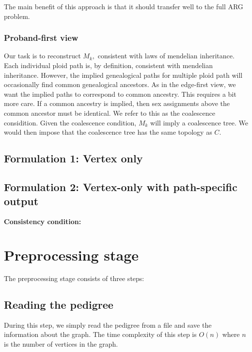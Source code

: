 \documentclass[14pt]{extarticle}
\begin{document}
The main benefit of this approach is that it should transfer well to the full ARG problem. 

\subsubsection{Proband-first view}
Our task is to reconstruct $M_k,$ consistent with laws of mendelian inheritance. Each individual ploid path is, by definition, consistent with mendelian inheritance. 
However, the implied genealogical paths for multiple ploid path will occasionally find common genealogical ancestors. As in the edge-first view, we want the 
implied paths to correspond to common ancestry. This requires a bit more care. If a common ancestry is implied, then sex assignments above the common ancestor must be identical. 
We refer to this as the coalescence considition. Given the coalescence condition, $M_k$ will imply a coalescence tree. 
We would then impose that the coalescence tree has the same topology as $C.$  







 

\subsection{Formulation 1: Vertex only} 

\subsection{Formulation 2: Vertex-only with path-specific output}

\textbf{Consistency condition:} 

\section{Preprocessing stage}

The preprocessing stage consists of three steps:

\subsection{Reading the pedigree}

During this step, we simply read the pedigree from a file and save the information about the graph. The time complexity of this step is $O(n)$ where $n$ is the number of vertices in the graph.
\end{document}
